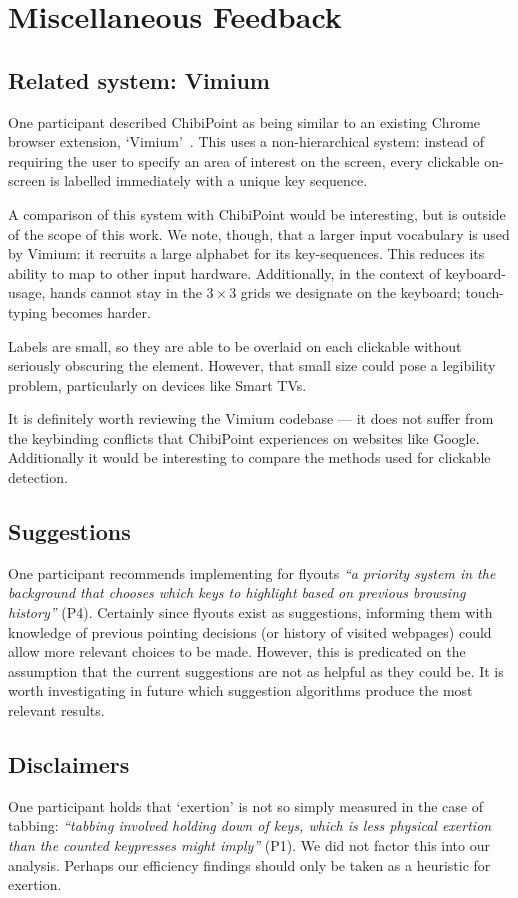 \documentclass[11pt,openright,a4paper]{report}
\begin{document}
\section{Miscellaneous Feedback}
\subsection{Related system: Vimium}
One participant described ChibiPoint as being similar to an existing Chrome browser extension, `Vimium'~\cite{vimium}. This uses a non-hierarchical system: instead of requiring the user to specify an area of interest on the screen, every clickable on-screen is labelled immediately with a unique key sequence.

A comparison of this system with ChibiPoint would be interesting, but is outside of the scope of this work. We note, though, that a larger input vocabulary is used by Vimium: it recruits a large alphabet for its key-sequences. This reduces its ability to map to other input hardware. Additionally, in the context of keyboard-usage, hands cannot stay in the $3\times3$ grids we designate on the keyboard; touch-typing becomes harder.

Labels are small, so they are able to be overlaid on each clickable without seriously obscuring the element. However, that small size could pose a legibility problem, particularly on devices like Smart TVs.

It is definitely worth reviewing the Vimium codebase --- it does not suffer from the keybinding conflicts that ChibiPoint experiences on websites like Google. Additionally it would be interesting to compare the methods used for clickable detection.
\subsection{Suggestions}
One participant recommends implementing for flyouts \textit{``a priority system in the background that chooses which keys to highlight based on previous browsing history''} (P4). Certainly since flyouts exist as suggestions, informing them with knowledge of previous pointing decisions (or history of visited webpages) could allow more relevant choices to be made. However, this is predicated on the assumption that the current suggestions are not as helpful as they could be. It is worth investigating in future which suggestion algorithms produce the most relevant results.

\subsection{Disclaimers}
One participant holds that `exertion' is not so simply measured in the case of tabbing: \textit{``tabbing involved holding down of keys, which is less physical exertion than the counted keypresses might imply''} (P1). We did not factor this into our analysis. Perhaps our efficiency findings should only be taken as a heuristic for exertion.
\end{document}
